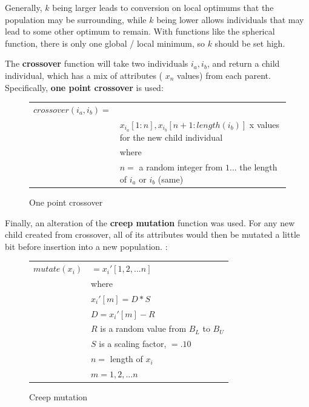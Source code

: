 \documentclass[12pt]{article}
\begin{document}
Generally, $ k $ being larger leads to conversion on local optimums that the population may be surrounding, while $ k $ being lower allows individuals that may lead to some other optimum to remain. With functions like the spherical function, there is only one global / local minimum, so $ k $ should be set high.

The \textbf{crossover} function will take two individuals $ i_a, i_b $, and return a child individual, which has a mix of attributes ( $x_n $ values) from each parent. Specifically, \textbf{one point crossover} is used:
\begin{figure}[!h]
        \begin{center}
		\begin{tabular}{r l}
	                $ crossover(i_a, i_b) = $ & \\
			& $ x_{i_a}[1:n], x_{i_b}[n + 1:length(i_b)] $ x values for the new child individual \\
								& where \\
								& $ n = $ a random integer from $ 1 ... $ the length of $ i_a $ or $ i_b$ (same)
		\end{tabular} 
               	\caption{One point crossover}
                \label{one_crossover}
        \end{center}
\end{figure}

Finally, an alteration of the \textbf{creep mutation} function was used. For any new child created from crossover, all of its attributes would then be mutated a little bit before insertion into a new population. :

\begin{figure}[!h]
        \begin{center}
		\begin{tabular}{r l}
	                $ mutate(x_i) $ 		& $ = x_{i}{'}[1,2, ... n] $  \\
								& where \\
								& $ x_{i}{'}[m] = D * S $\\
								& $ D = x_{i}{'}[m] - R $ \\
								& $ R $ is a random value from $ B_L $ to $ B_U $ \\ 
								& $ S $ is a scaling factor, $ = .10 $ \\
								& $ n = $ length of $x_i$ \\
								& $ m = 1,2,...n$ \\
		\end{tabular} 
               	\caption{Creep mutation}
                \label{creep_mutation}
        \end{center}
\end{figure}
\end{document}
